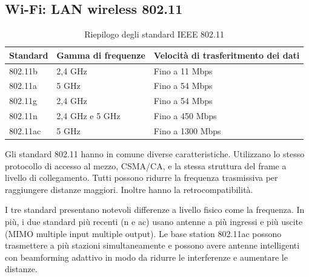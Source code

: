 \documentclass[11pt,a4paper]{article}
\begin{document}
\subsection{Wi-Fi: LAN wireless 802.11}
\begin{table}[]
	\begin{tabular}{|l|l|l|}
		\hline
		\multicolumn{1}{|c|}{\textbf{Standard}} & \multicolumn{1}{c|}{\textbf{Gamma di frequenze}} & \multicolumn{1}{c|}{\textbf{Velocità di trasferitmento dei dati}} \\ \hline
		802.11b                                 & 2,4 GHz                                          & Fino a 11 Mbps                                                    \\ \hline
		802.11a                                 & 5 GHz                                            & Fino a 54 Mbps                                                    \\ \hline
		802.11g                                 & 2,4 GHz                                          & Fino a 54 Mbps                                                    \\ \hline
		802.11n                                 & 2,4 GHz e 5 GHz                                  & Fino a 450 Mbps                                                   \\ \hline
		802.11ac                                & 5 GHz                                            & Fino a 1300 Mbps                                                  \\ \hline
	\end{tabular}
	\caption{Riepilogo degli standard IEEE 802.11}
	\label{tab: 005}
\end{table}
Gli standard 802.11 hanno in comune diverse caratteristiche. Utilizzano lo stesso protocollo di accesso al mezzo, CSMA/CA, e la stessa struttura del frame a livello di collegamento. Tutti possono ridurre la frequenza trasmissiva per raggiungere distanze maggiori. Inoltre hanno la retrocompatibilità.

I tre standard presentano notevoli differenze a livello fisico come la frequenza. In più, i due standard più recenti (n e ac) usano antenne a più ingressi e più uscite (MIMO multiple input multiple output). Le base station 802.11ac possono trasmettere a più stazioni simultaneamente e possono avere antenne intelligenti con beamforming adattivo in modo da ridurre le interferenze e aumentare le distanze.
\end{document}
